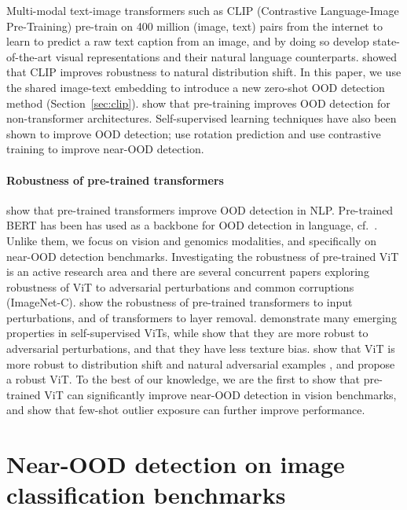 \documentclass{article}
\begin{document}
Multi-modal text-image transformers such as CLIP (Contrastive Language-Image Pre-Training) \citep{clip} pre-train on 400 million (image, text) pairs from the internet to learn to predict a raw text caption from an image, and by doing so develop state-of-the-art visual representations and their natural language counterparts. \citet{clip} showed that CLIP improves robustness to natural distribution shift. In this paper, we use the shared image-text embedding to introduce a new zero-shot OOD detection method (Section~\ref{sec:clip}). 
\citet{hendrycks2019usingpretraining} show that pre-training improves OOD detection for non-transformer architectures.  Self-supervised learning techniques have also been shown to improve OOD detection; \citet{hendrycks2019usingssl} use rotation prediction and \citet{winkens2020contrastive} use contrastive training to improve near-OOD detection.  

\paragraph{Robustness of pre-trained transformers}
\citet{hendrycks2020pretrained} show that pre-trained transformers improve OOD detection in NLP. Pre-trained BERT has been has used as a backbone for OOD detection in language, cf.~\citep{liu2020simple}.  
Unlike them, we focus on vision and genomics modalities, and specifically on near-OOD detection benchmarks.  
Investigating the robustness of pre-trained ViT is an active research area and there are several concurrent papers exploring robustness of ViT to adversarial perturbations and common corruptions (ImageNet-C).   
\citet{bhojanapalli2021understanding} show  the robustness of pre-trained transformers to input perturbations, and of transformers to layer removal. \citet{caron2021emerging} demonstrate many emerging properties in self-supervised ViTs, while \citet{shao2021adversarial, mahmood2021robustness} show that they are more robust to adversarial perturbations, and \citet{naseer2021intriguing} that they have less texture bias. \citet{paul2021vision, minderer2021revisiting} show that ViT is more robust to distribution shift and natural adversarial examples \citep{paul2021vision}, and \citet{mao2021robust} propose a robust ViT.
To the best of our knowledge, we are the first to show that pre-trained ViT can significantly improve near-OOD detection in vision benchmarks, and show that few-shot outlier exposure can further improve performance.  



\section{Near-OOD detection on image classification benchmarks}
\end{document}
